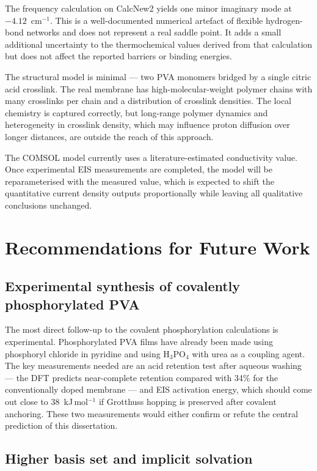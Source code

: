 \documentclass[12pt,a4paper]{report}
\begin{document}
The frequency calculation on CalcNew2 yields one minor 
imaginary mode at $-4.12$~cm\(^{-1}\). This is a 
well-documented numerical artefact of flexible 
hydrogen-bond networks and does not represent a real 
saddle point. It adds a small additional uncertainty to 
the thermochemical values derived from that calculation 
but does not affect the reported barriers or binding 
energies.

The structural model is minimal — two PVA monomers 
bridged by a single citric acid crosslink. The real 
membrane has high-molecular-weight polymer chains with 
many crosslinks per chain and a distribution of crosslink 
densities. The local chemistry is captured correctly, 
but long-range polymer dynamics and heterogeneity in 
crosslink density, which may influence proton diffusion 
over longer distances, are outside the reach of this 
approach.

The COMSOL model currently uses a literature-estimated 
conductivity value. Once experimental EIS measurements 
are completed, the model will be reparameterised with 
the measured value, which is expected to shift the 
quantitative current density outputs proportionally 
while leaving all qualitative conclusions unchanged.

\section{Recommendations for Future Work}

\subsection*{Experimental synthesis of covalently 
phosphorylated PVA}

The most direct follow-up to the covalent phosphorylation 
calculations is experimental. Phosphorylated PVA films 
have already been made using phosphoryl chloride in 
pyridine and using H\(_3\)PO\(_4\) with urea as a 
coupling agent. The key measurements needed are an acid 
retention test after aqueous washing — the DFT predicts 
near-complete retention compared with 34\% for the 
conventionally doped membrane — and EIS activation 
energy, which should come out close to 38~kJ\,mol\(^{-1}\) 
if Grotthuss hopping is preserved after covalent anchoring. 
These two measurements would either confirm or refute 
the central prediction of this dissertation.

\subsection*{Higher basis set and implicit solvation}
\end{document}
